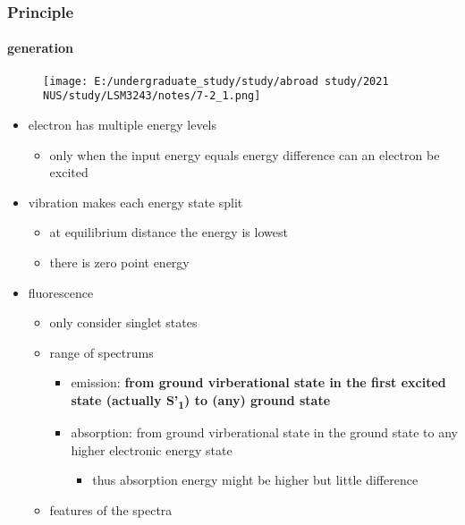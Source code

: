 \documentclass[]{article}
\let\oldparagraph\paragraph
\renewcommand{\paragraph}[1]{\oldparagraph{#1}\mbox{}}
\begin{document}
\hypertarget{principle-2}{%
\subsubsection{Principle}\label{principle-2}}

\hypertarget{generation}{%
\paragraph{generation}\label{generation}}

\begin{figure}
\centering
\texttt{[image: E:/undergraduate\_study/study/abroad study/2021 NUS/study/LSM3243/notes/7-2\_1.png]}
\caption{}
\end{figure}

\begin{itemize}
\item
  electron has multiple energy levels

  \begin{itemize}
  \item
    only when the input energy equals energy difference can an electron
    be excited
  \end{itemize}
\item
  vibration makes each energy state split

  \begin{itemize}
  \item
    at equilibrium distance the energy is lowest
  \item
    there is zero point energy
  \end{itemize}
\item
  fluorescence

  \begin{itemize}
  \item
    only consider singlet states
  \item
    range of spectrums

    \begin{itemize}
    \item
      emission: \textbf{from ground virberational state in the first
      excited state (actually S'\textsubscript{1}) to (any) ground
      state}
    \item
      absorption: from ground virberational state in the ground state to
      any higher electronic energy state

      \begin{itemize}
      \item
        thus absorption energy might be higher but little difference
      \end{itemize}
    \end{itemize}
  \item
    features of the spectra


\end{itemize}
\end{itemize}
\end{document}
